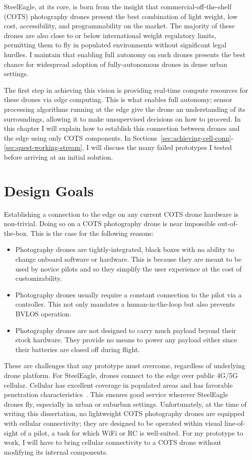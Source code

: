 SteelEagle, at its core, is born from the insight that commercial-off-the-shelf (COTS) photography drones present the best combination of light weight, low cost, accessibility, and programmability on the market. The majority of these drones are also close to or below international weight regulatory limits, permitting them to fly in populated environments without significant legal hurdles. I maintain that enabling full autonomy on such drones presents the best chance for widespread adoption of fully-autonomous drones in dense urban settings.

The first step in achieving this vision is providing real-time compute resources for these drones via edge computing. This is what enables full autonomy; sensor processing algorithms running at the edge give the drone an understanding of its surroundings, allowing it to make unsupervised decisions on how to proceed. In this chapter I will explain how to establish this connection between drones and the edge using only COTS components. In Sections~\ref{sec:achieving-cell-conn}-\ref{sec:quest-working-stream}, I will discuss the many failed prototypes I tested before arriving at an initial solution.

\section{Design Goals}
Establishing a connection to the edge on any current COTS drone hardware is non-trivial. Doing so on a COTS photography drone is near impossible out-of-the-box. This is the case for the following reasons:
\begin{itemize}
    \item Photography drones are tightly-integrated, black boxes with no ability to change onboard software or hardware. This is because they are meant to be used by novice pilots and so they simplify the user experience at the cost of customizability.
    \item Photography drones usually require a constant connection to the pilot via a controller. This not only mandates a human-in-the-loop but also prevents BVLOS operation.
    \item Photography drones are not designed to carry much payload beyond their stock hardware. They provide no means to power any payload either since their batteries are closed off during flight.
\end{itemize}
These are challenges that any prototype must overcome, regardless of underlying drone platform.
\newpage
For SteelEagle, drones connect to the edge over public 4G/5G cellular. Cellular has excellent coverage in populated areas and has favorable penetration characteristics~\cite{FCC}. This ensures good service wherever SteelEagle drones fly, especially in urban or suburban settings. Unfortunately, at the time of writing this dissertation, no lightweight COTS photography drones are equipped with cellular connectivity; they are designed to be operated within visual line-of-sight of a pilot, a task for which WiFi or RC is well-suited. For my prototype to work, I will have to bring cellular connectivity to a COTS drone without modifying its internal components.

